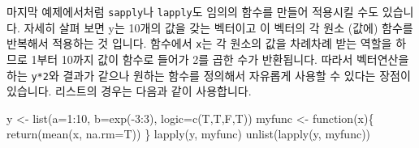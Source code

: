 \documentclass[
  a4paper,
]{book}
\newenvironment{Shaded}{\begin{snugshade}}{\end{snugshade}}
\newcommand{\AttributeTok}[1]{\textcolor[rgb]{0.40,0.45,0.13}{#1}}
\newcommand{\ControlFlowTok}[1]{\textcolor[rgb]{0.00,0.23,0.31}{#1}}
\newcommand{\DecValTok}[1]{\textcolor[rgb]{0.68,0.00,0.00}{#1}}
\newcommand{\FunctionTok}[1]{\textcolor[rgb]{0.28,0.35,0.67}{#1}}
\newcommand{\NormalTok}[1]{\textcolor[rgb]{0.00,0.23,0.31}{#1}}
\newcommand{\OtherTok}[1]{\textcolor[rgb]{0.00,0.23,0.31}{#1}}
\newcommand{\SpecialCharTok}[1]{\textcolor[rgb]{0.37,0.37,0.37}{#1}}
\begin{document}
\begin{Shaded}
\end{Shaded}

마지막 예제에서처럼 \texttt{sapply}나 \texttt{lapply}도 임의의 함수를
만들어 적용시킬 수도 있습니다. 자세히 살펴 보면 y는 10개의 값을 갖는
벡터이고 이 벡터의 각 원소 (값에) 함수를 반복해서 적용하는 것 입니다.
함수에서 \texttt{x}는 각 원소의 값을 차례차례 받는 역할을 하므로 1부터
10까지 값이 함수로 들어가 2를 곱한 수가 반환됩니다. 따라서 벡터연산을
하는 \texttt{y*2}와 결과가 같으나 원하는 함수를 정의해서 자유롭게 사용할
수 있다는 장점이 있습니다. 리스트의 경우는 다음과 같이 사용합니다.

\begin{Shaded}
\begin{Highlighting}[]
\NormalTok{y }\OtherTok{\textless{}{-}} \FunctionTok{list}\NormalTok{(}\AttributeTok{a=}\DecValTok{1}\SpecialCharTok{:}\DecValTok{10}\NormalTok{, }\AttributeTok{b=}\FunctionTok{exp}\NormalTok{(}\SpecialCharTok{{-}}\DecValTok{3}\SpecialCharTok{:}\DecValTok{3}\NormalTok{), }\AttributeTok{logic=}\FunctionTok{c}\NormalTok{(T,T,F,T))}
\NormalTok{myfunc }\OtherTok{\textless{}{-}} \ControlFlowTok{function}\NormalTok{(x)\{}
  \FunctionTok{return}\NormalTok{(}\FunctionTok{mean}\NormalTok{(x, }\AttributeTok{na.rm=}\NormalTok{T))}
\NormalTok{\}}
\FunctionTok{lapply}\NormalTok{(y, myfunc)}
\FunctionTok{unlist}\NormalTok{(}\FunctionTok{lapply}\NormalTok{(y, myfunc))}
\end{Highlighting}
\end{Shaded}
\end{document}
